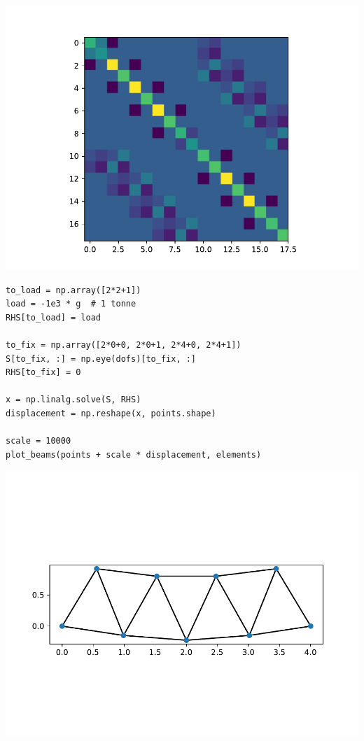 \includegraphics{truss_files/figure-latex/unnamed-chunk-1-2.pdf}

\begin{verbatim}
to_load = np.array([2*2+1])
load = -1e3 * g  # 1 tonne
RHS[to_load] = load

to_fix = np.array([2*0+0, 2*0+1, 2*4+0, 2*4+1])
S[to_fix, :] = np.eye(dofs)[to_fix, :]
RHS[to_fix] = 0

x = np.linalg.solve(S, RHS)
displacement = np.reshape(x, points.shape)

scale = 10000
plot_beams(points + scale * displacement, elements)
\end{verbatim}

\includegraphics{truss_files/figure-latex/unnamed-chunk-1-3.pdf}
